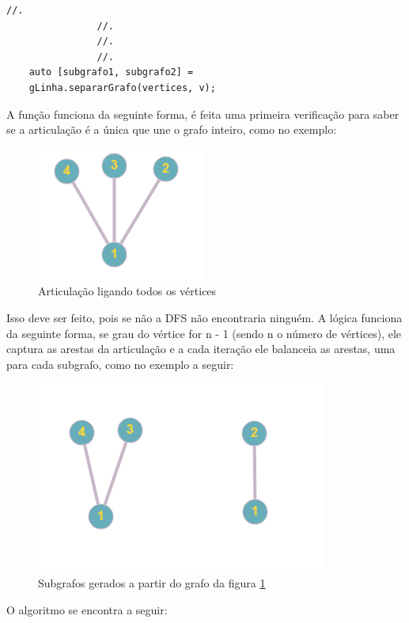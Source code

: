 \documentclass[10pt,conference]{IEEEtran}
\begin{document}
\begin{lstlisting}//.
                //.
                //.
                //.
    auto [subgrafo1, subgrafo2] = 
    gLinha.separarGrafo(vertices, v);
\end{lstlisting}
A função funciona da seguinte forma, é feita uma primeira verificação para saber se a articulação é a única que une o grafo inteiro, como no exemplo:
\begin{figure}
    \centering
    \includegraphics[width=0.5\linewidth]{figs/exampleGraph.png}
    \caption{Articulação ligando todos os vértices}
    \label{fig::graphArt}
\end{figure}
Isso deve ser feito, pois se não a DFS não encontraria ninguém. A lógica funciona da seguinte forma, se grau do vértice for n - 1 (sendo n o número de vértices), ele captura as arestas da articulação e a cada iteração ele balanceia as arestas, uma para cada subgrafo, como no exemplo a seguir:
\begin{figure}
    \centering
    \includegraphics[width=0.5\linewidth]{figs/subgraphExample.png}
    \caption{Subgrafos gerados a partir do grafo da figura \ref{fig::graphArt}}
    \label{fig:enter-label}
\end{figure}
O algoritmo se encontra a seguir:

\newpage
\end{document}
